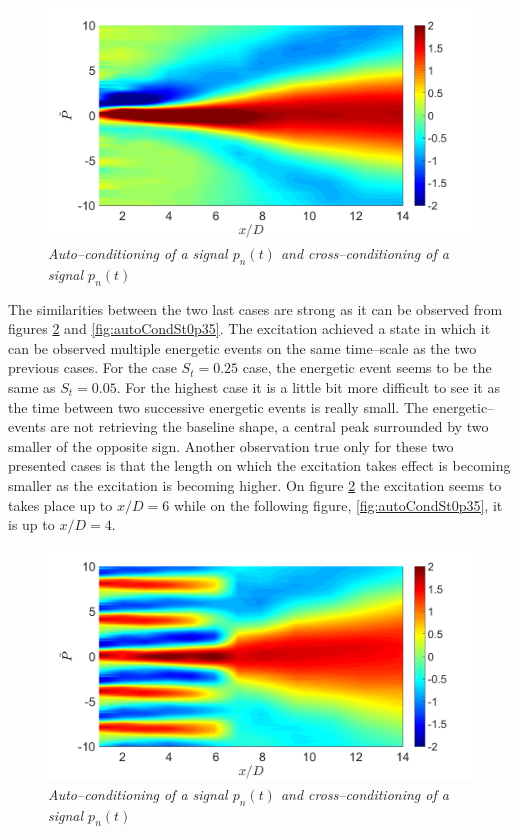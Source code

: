 \begin{figure}
	\centering
	\includegraphics[width=1\textwidth]{Figures/conditioning/autoCondSt0p05.png}
	\caption{\textit{Auto--conditioning of a signal $p_n(t)$ and cross--conditioning of a signal $p_n(t)$}}
	\label{fig:autoCondSt0p05}
\end{figure}

The similarities between the two last cases are strong as it can be observed from figures \ref{fig:autoCondSt0p25} and \ref{fig:autoCondSt0p35}. The excitation achieved a state in which it can be observed multiple energetic events on the same time--scale as the two previous cases. For the case $S_t = 0.25$ case, the energetic event seems to be the same as $S_t = 0.05$. For the highest case it is a little bit more difficult to see it as the time between two successive energetic events is really small. The energetic--events are not retrieving the baseline shape, a central peak surrounded by two smaller of the opposite sign. Another observation true only for these two presented cases is that the length on which the excitation takes effect is becoming smaller as the excitation is becoming higher. On figure \ref{fig:autoCondSt0p25} the excitation seems to takes place up to $x/D=6$ while on the following figure, \ref{fig:autoCondSt0p35}, it is up to $x/D=4$. 
\begin{figure}
	\centering
	\includegraphics[width=1\textwidth]{Figures/conditioning/autoCondSt0p25.png}
	\caption{\textit{Auto--conditioning of a signal $p_n(t)$ and cross--conditioning of a signal $p_n(t)$}}
	\label{fig:autoCondSt0p25}
\end{figure}

